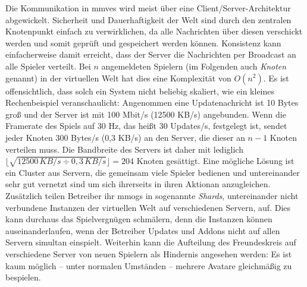 Die Kommunikation in \acp{mmve} wird meist über eine Client/Server-Architektur abgewickelt. Sicherheit und Dauerhaftigkeit der Welt sind durch den zentralen Knotenpunkt einfach zu verwirklichen, da alle Nachrichten über diesen verschickt werden und somit geprüft und gespeichert werden können. Konsistenz kann einfacherweise damit erreicht, dass der Server die Nachrichten per Broadcast an alle Spieler verteilt. Bei $n$ angemeldeten Spielern (im Folgenden auch \emph{Knoten} genannt) in der virtuellen Welt hat dies eine Komplexität von $O(n^2)$.  Es ist offensichtlich, dass solch ein System nicht beliebig skaliert, wie ein kleines Rechenbeispiel veranschaulicht: Angenommen eine Updatenachricht ist 10 Bytes groß und der Server ist mit 100 Mbit/s (12500 KB/s) angebunden. Wenn die Framerate des Spiels auf 30 Hz, das heißt 30 Updates/s, festgelegt ist, sendet jeder Knoten 300 Bytes/s (0,3 KB/s) an den Server, die dieser an $n-1$ Knoten verteilen muss. Die Bandbreite des Servers ist daher mit lediglich $\lfloor\sqrt{12500\,KB/s \div 0,3\,KB/s}\rfloor = 204$ Knoten gesättigt. Eine mögliche Lösung ist ein Cluster aus Servern, die gemeinsam viele Spieler bedienen und untereinander sehr gut vernetzt sind um sich ihrerseits in ihren Aktionan anzugleichen. Zusätzlich teilen Betreiber ihr \acp{mmog} in sogenannte \emph{Shards}, untereinander nicht verbundene Instanzen der virtuellen Welt auf verschiedenen Servern, auf. Dies kann durchaus das Spielvergnügen schmälern, denn die Instanzen können auseinanderlaufen, wenn der Betreiber Updates und Addons nicht auf allen Servern simultan einspielt. Weiterhin kann die Aufteilung des Freundeskreis auf verschiedene Server von neuen Spielern als Hindernis angesehen werden: Es ist kaum möglich -- unter normalen Umständen -- mehrere Avatare gleichmäßig zu bespielen.

